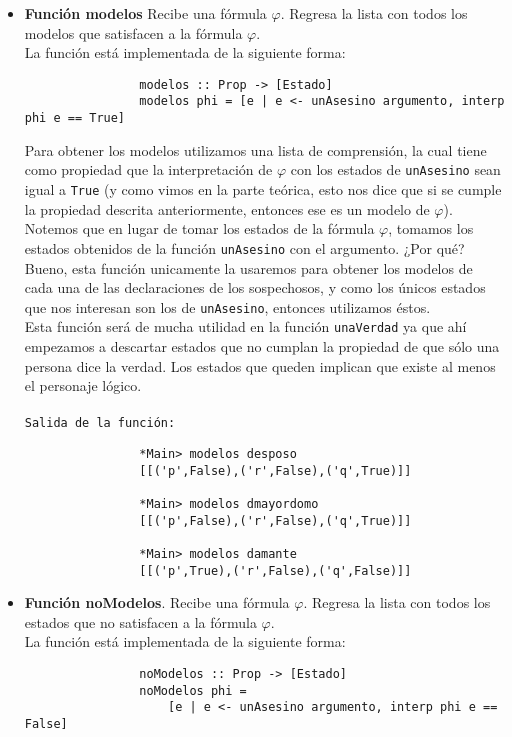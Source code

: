 \documentclass[letterpaper,12pt]{article}
\begin{document}
\begin{itemize}
\begin{itemize}
            \item \textbf{Función modelos} Recibe una fórmula $\varphi$. 
            Regresa la lista con todos los modelos que satisfacen a la 
            fórmula $\varphi$. \\
            La función está implementada de la siguiente forma:
            \begin{lstlisting}
                modelos :: Prop -> [Estado]
                modelos phi = [e | e <- unAsesino argumento, interp phi e == True]
            \end{lstlisting}

            Para obtener los modelos utilizamos una lista de comprensión, la 
            cual tiene como propiedad que la interpretación de $\varphi$ con
            los estados de \texttt{unAsesino} sean igual a \texttt{True} (y 
            como vimos en la parte teórica, esto nos dice que si se cumple 
            la propiedad descrita anteriormente, entonces ese es un modelo 
            de $\varphi$). Notemos que en lugar de tomar los estados de la 
            fórmula $\varphi$, tomamos los estados obtenidos de la función 
            \texttt{unAsesino} con el argumento. ¿Por qué? Bueno, esta 
            función unicamente la usaremos para obtener los modelos de cada
            una de las declaraciones de los sospechosos, y como los únicos 
            estados que nos interesan son los de \texttt{unAsesino}, 
            entonces utilizamos éstos. \\
            Esta función será de mucha utilidad en la función 
            \texttt{unaVerdad} ya que ahí empezamos a descartar estados que 
            no cumplan la propiedad de que sólo una persona dice la verdad. 
            Los estados que queden implican que existe al menos el 
            personaje lógico. \\ \\
            \texttt{Salida de la función:}
            \begin{lstlisting}
                *Main> modelos desposo
                [[('p',False),('r',False),('q',True)]]

                *Main> modelos dmayordomo
                [[('p',False),('r',False),('q',True)]]

                *Main> modelos damante
                [[('p',True),('r',False),('q',False)]]
            \end{lstlisting}

            \item \textbf{Función noModelos}. Recibe una fórmula $\varphi$.
            Regresa la lista con todos los estados que no satisfacen a la 
            fórmula $\varphi$. \\
            La función está implementada de la siguiente forma:
            \begin{lstlisting}
                noModelos :: Prop -> [Estado]
                noModelos phi = 
                    [e | e <- unAsesino argumento, interp phi e == False]
            \end{lstlisting}


\end{itemize}
\end{itemize}
\end{document}
